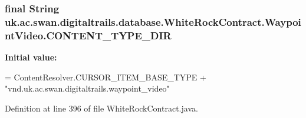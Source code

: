 \hypertarget{classuk_1_1ac_1_1swan_1_1digitaltrails_1_1database_1_1_white_rock_contract_1_1_waypoint_video_af4f61e30876e0a51b2be7e54462d1724}{
\subsubsection[{C\+O\+N\+T\+E\+N\+T\+\_\+\+T\+Y\+P\+E\+\_\+\+D\+I\+R}]{\setlength{\rightskip}{0pt plus 5cm}final String uk.\+ac.\+swan.\+digitaltrails.\+database.\+White\+Rock\+Contract.\+Waypoint\+Video.\+C\+O\+N\+T\+E\+N\+T\+\_\+\+T\+Y\+P\+E\+\_\+\+D\+I\+R\hspace{0.3cm}{\ttfamily [static]}}}\label{classuk_1_1ac_1_1swan_1_1digitaltrails_1_1database_1_1_white_rock_contract_1_1_waypoint_video_af4f61e30876e0a51b2be7e54462d1724}
{\bfseries Initial value\+:}
\begin{DoxyCode}
= ContentResolver.CURSOR\_ITEM\_BASE\_TYPE +
                \textcolor{stringliteral}{"vnd.uk.ac.swan.digitaltrails.waypoint\_video"}
\end{DoxyCode}


Definition at line 396 of file White\+Rock\+Contract.\+java.

